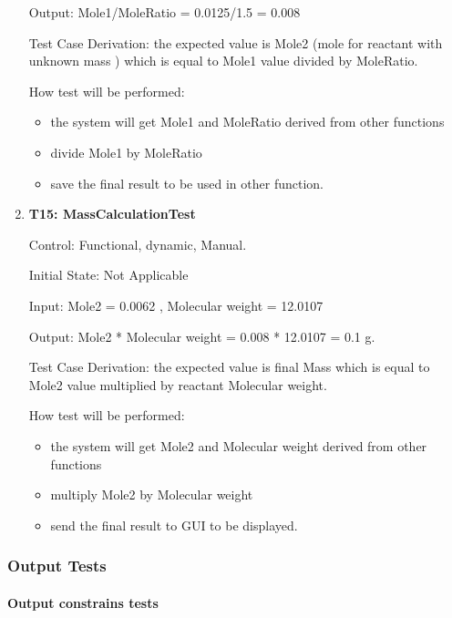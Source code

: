 \documentclass[12pt, titlepage]{article}
\begin{document}
\begin{enumerate}
Output:  Mole1/MoleRatio = 0.0125/1.5 =  0.008

Test Case Derivation: the expected value is Mole2 (mole for reactant with unknown mass ) which is equal to Mole1 value divided by MoleRatio.  				
	
How test will be performed: 
\begin{itemize}
\item the system will get Mole1 and MoleRatio derived from other functions
\item divide Mole1 by MoleRatio  
\item save the final result to be used in other function.
\end{itemize}

\item{\bf T15: MassCalculationTest\\}

Control: Functional, dynamic, Manual.
					
Initial State: Not Applicable
					
Input: Mole2 = 0.0062  , Molecular weight = 12.0107
			
Output:  Mole2 * Molecular weight = 0.008 * 12.0107 = 0.1 g.

Test Case Derivation: the expected value is final Mass which is equal to Mole2 value multiplied by reactant Molecular weight.  				

How test will be performed: 
\begin{itemize}
\item the system will get Mole2 and Molecular weight derived from other functions
\item multiply Mole2 by Molecular weight  
\item send the final result to GUI to be displayed.
\end{itemize}

\end{enumerate}		


\subsubsection{Output Tests}

\paragraph{Output constrains tests}
\end{document}
